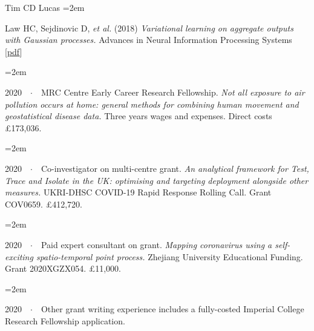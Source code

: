 \documentclass{scrartcl}
\newcommand{\MarginText}[1]{\marginpar{\raggedleft\itshape\small#1}} %
\newcommand{\Description}[1]{\hangindent=2em\hangafter=0\noindent\raggedright\footnotesize{#1}\par\normalsize\vspace{1em}} %
\begin{document}
\begin{cv}{Tim {\Large CD} Lucas}
\Description{\MarginText{2018}Law HC, Sejdinovic D, \emph{et al.} (2018) \emph{Variational learning on aggregate outputs with Gaussian processes.} Advances in Neural Information Processing Systems [\href{http://papers.nips.cc/paper/7847-variational-learning-on-aggregate-outputs-with-gaussian-processes.pdf}{pdf}]}


\vspace{1em} %





{\color{Maroon}}\vspace{1em}

\Description{2020\ \ $\cdotp$\ \ MRC Centre Early Career Research Fellowship. \emph{Not all exposure to air pollution occurs at home: general methods for combining human movement and geostatistical disease data.} Three years wages and expenses. Direct costs £173,036.}
\vspace{-0.5em} %


\Description{2020\ \ $\cdotp$\ \ Co-investigator on multi-centre grant. \emph{An analytical framework for Test, Trace and Isolate in the UK: optimising and targeting deployment alongside other measures.} UKRI-DHSC COVID-19 Rapid Response Rolling Call. Grant COV0659. £412,720.}
\vspace{-0.5em} %



\Description{2020\ \ $\cdotp$\ \ Paid expert consultant on grant. \emph{Mapping coronavirus using a self-exciting spatio-temporal point process.} Zhejiang University Educational Funding. Grant 2020XGZX054. £11,000.}
\vspace{-0.5em} %


\Description{2020\ \ $\cdotp$\ \ Other grant writing experience includes a fully-costed Imperial College Research Fellowship application.}
\vspace{-0.5em} 

\vspace{1em} %









\end{cv}
\end{document}
